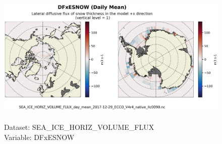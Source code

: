 \begin{figure}[H]
\centering
\includegraphics[scale=0.5]{../images/plots/native_plots/Sea-Ice_and_Snow_Horizontal_Volume_Fluxes/DFxESNOW.png}
\caption{\\Dataset: SEA\_ICE\_HORIZ\_VOLUME\_FLUX\\Variable: DFxESNOW}
\label{tab:table-SEA_ICE_HORIZ_VOLUME_FLUX_DFxESNOW-Plot}
\end{figure}
\pagebreak
